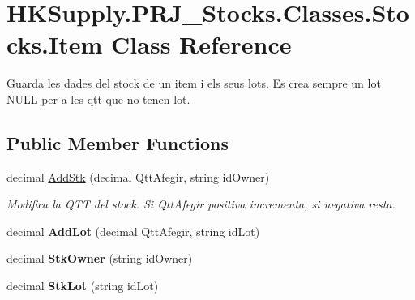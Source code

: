 \hypertarget{class_h_k_supply_1_1_p_r_j___stocks_1_1_classes_1_1_stocks_1_1_item}{}\section{H\+K\+Supply.\+P\+R\+J\+\_\+\+Stocks.\+Classes.\+Stocks.\+Item Class Reference}
\label{class_h_k_supply_1_1_p_r_j___stocks_1_1_classes_1_1_stocks_1_1_item}


Guarda les dades del stock de un item i els seus lots. Es crea sempre un lot N\+U\+LL per a les qtt que no tenen lot.  


\subsection*{Public Member Functions}
\begin{DoxyCompactItemize}
\item 
\mbox{\label{class_h_k_supply_1_1_p_r_j___stocks_1_1_classes_1_1_stocks_1_1_item_aaf3e2edf25336af385d1b82d05cf49df}} 
decimal \mbox{\hyperlink{class_h_k_supply_1_1_p_r_j___stocks_1_1_classes_1_1_stocks_1_1_item_aaf3e2edf25336af385d1b82d05cf49df}{Add\+Stk}} (decimal Qtt\+Afegir, string id\+Owner)
\begin{DoxyCompactList}\small\item\em Modifica la Q\+TT del stock. Si Qtt\+Afegir positiva incrementa, si negativa resta. \end{DoxyCompactList}\item 
\mbox{\label{class_h_k_supply_1_1_p_r_j___stocks_1_1_classes_1_1_stocks_1_1_item_a33427d6dd0eddd6bbb1f9321cad9b25c}} 
decimal {\bfseries Add\+Lot} (decimal Qtt\+Afegir, string id\+Lot)
\item 
\mbox{\label{class_h_k_supply_1_1_p_r_j___stocks_1_1_classes_1_1_stocks_1_1_item_a9ff5d936d515998434e4dd40d9dac833}} 
decimal {\bfseries Stk\+Owner} (string id\+Owner)
\item 
\mbox{\label{class_h_k_supply_1_1_p_r_j___stocks_1_1_classes_1_1_stocks_1_1_item_a49584d4ec9731ab9258331081d9be238}} 
decimal {\bfseries Stk\+Lot} (string id\+Lot)
\end{DoxyCompactItemize}
